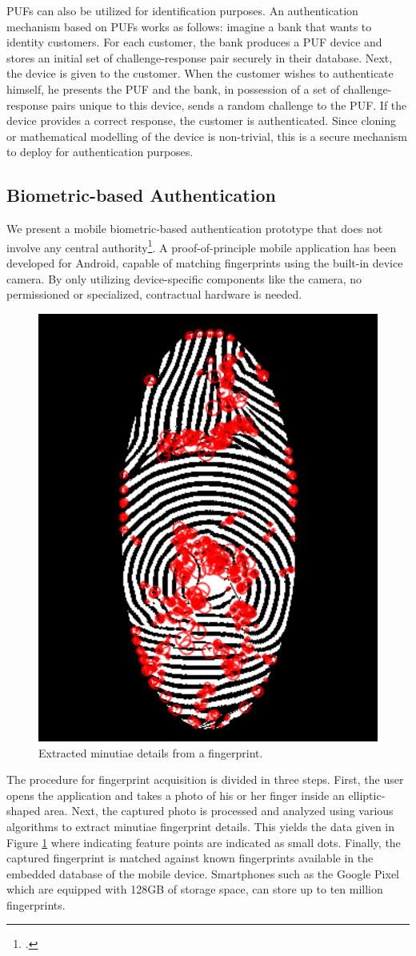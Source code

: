 \documentclass[USenglish]{article}
\begin{document}
PUFs can also be utilized for identification purposes.
An authentication mechanism based on PUFs works as follows: imagine a bank that wants to identity customers.
For each customer, the bank produces a PUF device and stores an initial set of challenge-response pair securely in their database.
Next, the device is given to the customer.
When the customer wishes to authenticate himself, he presents the PUF and the bank, in possession of a set of challenge-response pairs unique to this device, sends a random challenge to the PUF.
If the device provides a correct response, the customer is authenticated.
Since cloning or mathematical modelling of the device is non-trivial, this is a secure mechanism to deploy for authentication purposes.

\subsection{Biometric-based Authentication}

We present a mobile biometric-based authentication prototype that does not involve any central authority\footcite{hammudoglu2017portable}.
A proof-of-principle mobile application has been developed for Android, capable of matching fingerprints using the built-in device camera.
By only utilizing device-specific components like the camera, no permissioned or specialized, contractual hardware is needed.

\begin{figure}[t]
	\centering
	\includegraphics[width=.5\columnwidth]{assets/fingerprint}
	\caption{Extracted minutiae details from a fingerprint.}
	\label{fig:fingerprint}
\end{figure}

The procedure for fingerprint acquisition is divided in three steps.
First, the user opens the application and takes a photo of his or her finger inside an elliptic-shaped area.
Next, the captured photo is processed and analyzed using various algorithms to extract minutiae fingerprint details.
This yields the data given in Figure \ref{fig:fingerprint} where indicating feature points are indicated as small dots.
Finally, the captured fingerprint is matched against known fingerprints available in the embedded database of the mobile device.
Smartphones such as the Google Pixel which are equipped with 128GB of storage space, can store up to ten million fingerprints.
\end{document}
